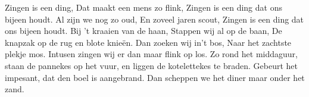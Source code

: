 \beginchorus
Zingen is een ding,
Dat maakt een mens zo flink,
Zingen is een ding dat ons bijeen houdt.
Al zijn we nog zo oud,
En zoveel jaren scout,
Zingen is een ding dat ons bijeen houdt. 
\endchorus
\beginverse*
Bij 't kraaien van de haan,
Stappen wij al op de baan,
De knapzak op de rug en blote knieën.
Dan zoeken wij in’t bos,
Naar het zachtste plekje mos. 
Intusen zingen wij er dan maar flink op los. 
\endverse
\beginverse*
Zo rond het middaguur,
staan de pannekes op het vuur,
en liggen de kotelettekes te braden.
Gebeurt het impesant,
dat den boel is aangebrand.
Dan scheppen we het diner maar onder het zand.
\endverse
\endsong
